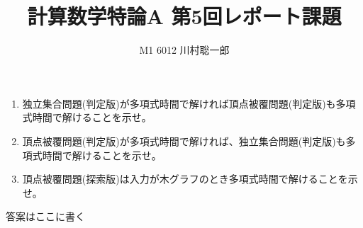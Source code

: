 \documentclass[dvipdfmx]{jsreport}
\title{計算数学特論A 第5回レポート課題}
\author{M1 6012 川村聡一郎}
\date{}
\begin{document}
\maketitle

\begin{tcolorbox}
\begin{enumerate}
	\item 独立集合問題(判定版)が多項式時間で解ければ頂点被覆問題(判定版)も多項式時間で解けることを示せ。
	\item 頂点被覆問題(判定版)が多項式時間で解ければ、独立集合問題(判定版)も多項式時間で解けることを示せ。
	\item 頂点被覆問題(探索版)は入力が木グラフのとき多項式時間で解けることを示せ。
\end{enumerate}
\end{tcolorbox}

\begin{souanswer} %
	答案はここに書く
\end{souanswer}
\end{document}
